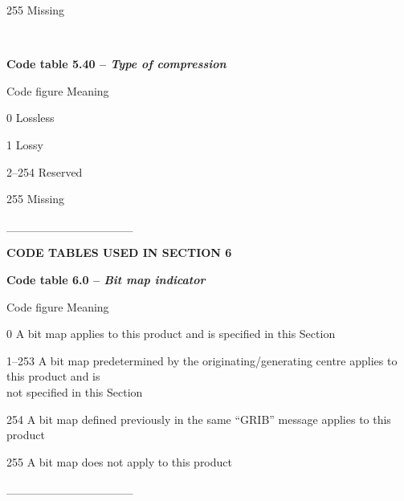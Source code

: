 255 Missing

\textbf{\\
}

\textbf{Code table 5.40 -- \emph{Type of compression}}

Code figure Meaning

0 Lossless

1 Lossy

2--254 Reserved

255 Missing

\_\_\_\_\_\_\_\_\_\_\_\_\_\_\_

\textbf{CODE TABLES USED IN SECTION 6}

\textbf{Code table 6.0 -- \emph{Bit map indicator}}

Code figure Meaning

0 A bit map applies to this product and is specified in this Section

1--253 A bit map predetermined by the originating/generating centre applies to this product and is\\
not specified in this Section

254 A bit map defined previously in the same ``GRIB'' message applies to this product

255 A bit map does not apply to this product

\_\_\_\_\_\_\_\_\_\_\_\_\_\_\_
